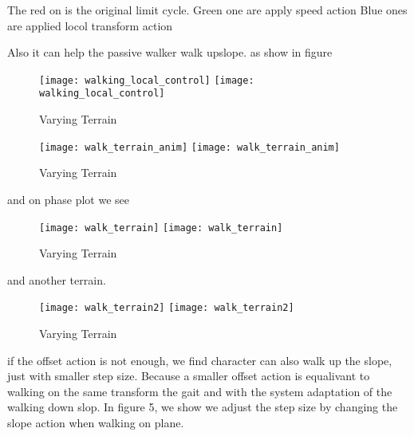 The red on is the original limit cycle.
Green one are apply speed action
Blue ones are applied  locol transform action

Also it can help the passive walker walk upslope.
as show in figure


\begin{figure}[!htbp]
  \begin{center}
    \leavevmode
    \ifpdf
      \texttt{[image: walking\_local\_control]}
    \else
      \texttt{[image: walking\_local\_control]}
    \fi
    \caption{Varying Terrain}
    \label{fig:diffterrain}
\end{center}
\end{figure}




\begin{figure}[!htbp]
  \begin{center}
    \leavevmode
    \ifpdf
      \texttt{[image: walk\_terrain\_anim]}
    \else
      \texttt{[image: walk\_terrain\_anim]}
    \fi
    \caption{Varying Terrain}
    \label{fig:diffterrain}
\end{center}
\end{figure}



and on phase plot we see

\begin{figure}[!htbp]
  \begin{center}
    \leavevmode
    \ifpdf
      \texttt{[image: walk\_terrain]}
    \else
      \texttt{[image: walk\_terrain]}
    \fi
    \caption{Varying Terrain}
    \label{fig:diffterrainphase}
\end{center}
\end{figure}

and another terrain.
\begin{figure}[!htbp]
  \begin{center}
    \leavevmode
    \ifpdf
      \texttt{[image: walk\_terrain2]}
    \else
      \texttt{[image: walk\_terrain2]}
    \fi
    \caption{Varying Terrain}
    \label{fig:diffterrainphase}
\end{center}
\end{figure}


if the offset action is not enough, we find character can also walk up the slope, just with smaller step size.
Because a smaller offset action is equalivant to walking on the same transform the gait and with the system adaptation of the walking down slop.
In figure 5, we show we adjust the step size by changing the slope action when walking on plane.

